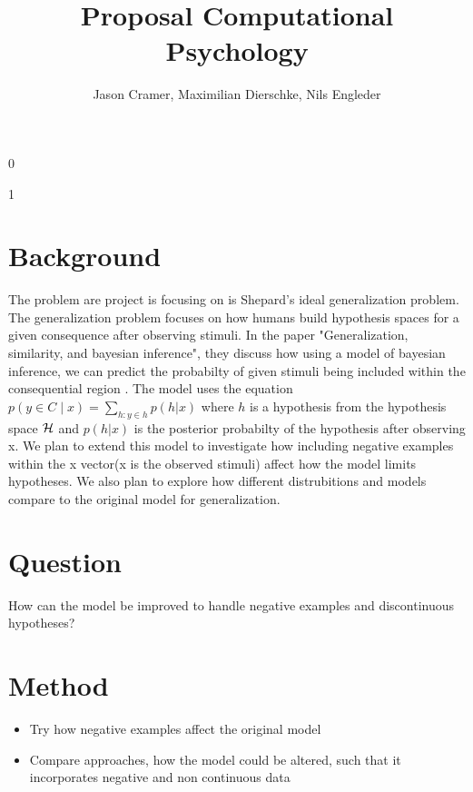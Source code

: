 \documentclass[]{scrartcl}
\title{Proposal Computational Psychology}
\begin{document}
\def\isblind{1}
\if\isblind0
    \author{Jason Cramer, Maximilian Dierschke, Nils Engleder}\fi
\if \isblind1
    \author{}\fi
\maketitle
\section{Background}
The problem are project is focusing on is Shepard's ideal generalization problem. The generalization problem focuses on how humans build hypothesis spaces for a given consequence after observing stimuli.
In the paper "Generalization, similarity, and bayesian inference", they discuss how using a model of bayesian inference, we can predict the probabilty of given stimuli being included within the consequential region \cite{Tenenbaum}.
The model uses the equation $p(y \in C \mid x) = \sum\limits_{h:y\in h} p(h | x)$ where $h$ is a hypothesis from the hypothesis space ${\cal H}$ and $p(h | x)$ is the posterior probabilty of  the hypothesis after observing x.
We plan to extend this model to investigate how including negative examples within the x vector(x is the observed stimuli) affect how the model limits hypotheses. We also plan to explore how different distrubitions and models compare to the original model for generalization.
\section{Question}
How can the model be improved to handle negative examples and discontinuous hypotheses?
\section{Method}
\begin{itemize}
	\item Try how negative examples affect the original model
	\item Compare approaches, how the model could be altered, such that it incorporates negative and non continuous data
\end{itemize} 
\nocite{*}
\printbibliography
\end{document}
